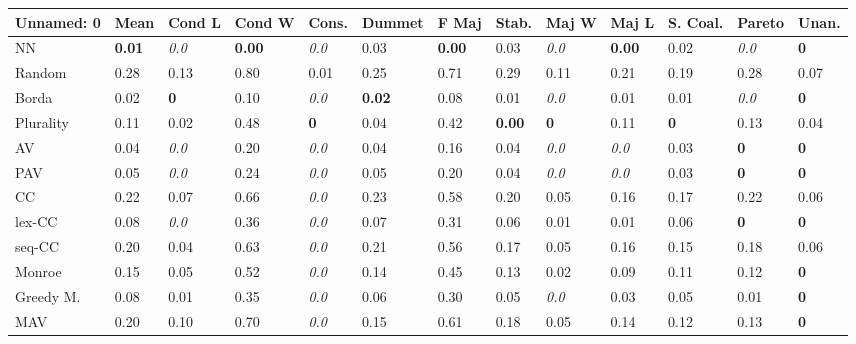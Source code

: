 \begin{tabular}{lllllllllllll}
\toprule
Unnamed: 0 & Mean & Cond L & Cond W & Cons. & Dummet & F Maj & Stab. & Maj W & Maj L & S. Coal. & Pareto & Unan. \\
\midrule
NN & \textbf{0.01} & \textit{0.0} & \textbf{0.00} & \textit{0.0} & 0.03 & \textbf{0.00} & 0.03 & \textit{0.0} & \textbf{0.00} & 0.02 & \textit{0.0} & \textbf{0} \\
Random & 0.28 & 0.13 & 0.80 & 0.01 & 0.25 & 0.71 & 0.29 & 0.11 & 0.21 & 0.19 & 0.28 & 0.07 \\
Borda & 0.02 & \textbf{0} & 0.10 & \textit{0.0} & \textbf{0.02} & 0.08 & 0.01 & \textit{0.0} & 0.01 & 0.01 & \textit{0.0} & \textbf{0} \\
Plurality & 0.11 & 0.02 & 0.48 & \textbf{0} & 0.04 & 0.42 & \textbf{0.00} & \textbf{0} & 0.11 & \textbf{0} & 0.13 & 0.04 \\
AV & 0.04 & \textit{0.0} & 0.20 & \textit{0.0} & 0.04 & 0.16 & 0.04 & \textit{0.0} & \textit{0.0} & 0.03 & \textbf{0} & \textbf{0} \\
PAV & 0.05 & \textit{0.0} & 0.24 & \textit{0.0} & 0.05 & 0.20 & 0.04 & \textit{0.0} & \textit{0.0} & 0.03 & \textbf{0} & \textbf{0} \\
CC & 0.22 & 0.07 & 0.66 & \textit{0.0} & 0.23 & 0.58 & 0.20 & 0.05 & 0.16 & 0.17 & 0.22 & 0.06 \\
lex-CC & 0.08 & \textit{0.0} & 0.36 & \textit{0.0} & 0.07 & 0.31 & 0.06 & 0.01 & 0.01 & 0.06 & \textbf{0} & \textbf{0} \\
seq-CC & 0.20 & 0.04 & 0.63 & \textit{0.0} & 0.21 & 0.56 & 0.17 & 0.05 & 0.16 & 0.15 & 0.18 & 0.06 \\
Monroe & 0.15 & 0.05 & 0.52 & \textit{0.0} & 0.14 & 0.45 & 0.13 & 0.02 & 0.09 & 0.11 & 0.12 & \textbf{0} \\
Greedy M. & 0.08 & 0.01 & 0.35 & \textit{0.0} & 0.06 & 0.30 & 0.05 & \textit{0.0} & 0.03 & 0.05 & 0.01 & \textbf{0} \\
MAV & 0.20 & 0.10 & 0.70 & \textit{0.0} & 0.15 & 0.61 & 0.18 & 0.05 & 0.14 & 0.12 & 0.13 & \textbf{0} \\
\bottomrule
\end{tabular}
